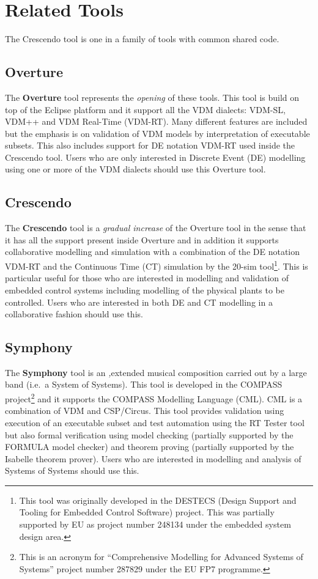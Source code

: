 \documentclass{crescendorepchap}
\begin{document}
\section{Related Tools}\label{sec:toolsIntro}

The Crescendo tool is one in a family of tools with common shared code.

\subsection{Overture}

The \textbf{Overture} tool represents the \emph{opening} of these tools. This tool is build on top of the Eclipse platform and it support all the VDM dialects: VDM-SL, VDM++ and VDM Real-Time (VDM-RT). Many different features are included but the emphasis is on validation of VDM models by interpretation of executable subsets. This also includes support for DE notation VDM-RT used inside the Crescendo tool. Users who are only interested in Discrete Event (DE) modelling using one or more of the VDM dialects should use this Overture tool.

\subsection{Crescendo}

The \textbf{Crescendo} tool is a \emph{gradual increase} of the Overture tool in the sense that it has all the support present inside Overture and in addition it supports collaborative modelling and simulation with a combination of the DE notation VDM-RT and the Continuous Time (CT) simulation by the 20-sim tool\footnote{This tool was originally developed in the DESTECS (Design Support and Tooling for Embedded Control Software) project. This was partially supported by EU as project number 248134 under the embedded system design area.}. This is particular useful for those who are interested in modelling and validation of embedded control systems including modelling of the physical plants to be controlled. Users who are interested in both DE and CT modelling in a collaborative fashion should use this.

\subsection{Symphony}

The \textbf{Symphony} tool is an \emph,{extended musical composition} carried out by a large band (i.e.\ a System of Systems). This tool is developed in the COMPASS project\footnote{This is an acronym for ``Comprehensive Modelling for Advanced Systems of Systems'' project number 287829 under the EU FP7 programme.} and it supports the COMPASS Modelling Language (CML). CML is a combination of VDM and CSP/Circus. This tool provides validation using execution of an executable subset and test automation using the RT Tester tool but also formal verification using model checking (partially supported by the FORMULA model checker) and theorem proving (partially supported by the Isabelle theorem prover). Users who are interested in modelling and analysis of Systems of Systems should use this.
\end{document}
